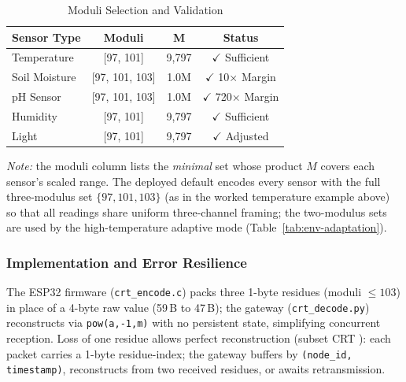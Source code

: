 \documentclass[pdflatex,sn-mathphys-num]{sn-jnl}
\theoremstyle{thmstyleone}
\theoremstyle{thmstyletwo}
\theoremstyle{thmstylethree}
\begin{document}
\begin{table}[htbp]
\caption{Moduli Selection and Validation}
\label{tab:moduli-validation}
\scriptsize
\centering
\begin{tabular}{p{}ccc}
\toprule
\textbf{Sensor Type} & \textbf{Moduli} & \textbf{M} & \textbf{Status} \\
\midrule
Temperature & [97, 101] & 9,797 & $\checkmark$ Sufficient \\
Soil Moisture & [97, 101, 103] & 1.0M & $\checkmark$ 10× Margin \\
pH Sensor & [97, 101, 103] & 1.0M & $\checkmark$ 720× Margin \\
Humidity & [97, 101] & 9,797 & $\checkmark$ Sufficient \\
Light & [97, 101] & 9,797 & $\checkmark$ Adjusted \\
\bottomrule
\end{tabular}
{\footnotesize \textit{Note:} the moduli column lists the \emph{minimal} set whose product $M$ covers each sensor's scaled range. The deployed default encodes every sensor with the full three-modulus set $\{97,101,103\}$ (as in the worked temperature example above) so that all readings share uniform three-channel framing; the two-modulus sets are used by the high-temperature adaptive mode (Table~\ref{tab:env-adaptation}).}
\end{table}

\subsubsection{Implementation and Error Resilience}
The ESP32 firmware (\texttt{crt\_encode.c}) packs three 1-byte residues (moduli $\leq 103$) in place of a 4-byte raw value (59\,B to 47\,B); the gateway (\texttt{crt\_decode.py}) reconstructs via \texttt{pow(a,-1,m)} with no persistent state, simplifying concurrent reception. Loss of one residue allows perfect reconstruction (subset CRT \cite{shoup2009computational}): each packet carries a 1-byte residue-index; the gateway buffers by \texttt{(node\_id, timestamp)}, reconstructs from two received residues, or awaits retransmission.
\end{document}
